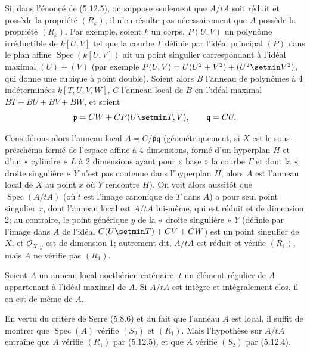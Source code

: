 \begin{remark}[5.12.6]
\label{IV.2.s5.12.6-fr}
Si, dans l'énoncé de (5.12.5), on suppose seulement que $A/tA$ soit réduit et
possède la propriété $(R_k)$, il n'en résulte pas nécessairement que $A$
possède la propriété $(R_k)$. Par exemple, soient $k$ un corps, $P(U,V)$ un
polynôme irréductible de $k[U,V]$ tel que la courbe $\Gamma$ définie par
l'idéal principal $(P)$ dans le plan affine $\operatorname{Spec}(k[U,V])$ ait
un point singulier correspondant à l'idéal maximal $(U)+(V)$ (par exemple
$P(U,V)=U(U^2+V^2)+(U^2\setmin V^2)$, qui donne une cubique à point double). Soient
alors $B$ l'anneau de polynômes à 4 indéterminées $k[T,U,V,W]$, $C$ l'anneau
local de $B$ en l'idéal maximal $BT+BU+BV+BW$, et soient
\[
\mathfrak p=CW+CP(U\setmin T,V),\qquad \mathfrak q=CU.
\]

Considérons alors l'anneau local $A=C/\mathfrak p\mathfrak q$
(géométriquement, si $X$ est le sous-préschéma fermé de l'espace affine à 4
dimensions, formé d'un hyperplan $H$ et d'un « cylindre » $L$ à 2 dimensions
ayant pour « base » la courbe $\Gamma$ et dont la « droite singulière » $Y$
n'est pas contenue dans l'hyperplan $H$, alors $A$ est l'anneau local de $X$ au
point $x$ où $Y$ rencontre $H$). On voit alors aussitôt que
$\operatorname{Spec}(A/tA)$ (où $t$ est l'image canonique de $T$ dans $A$) a
pour seul point singulier $x$, dont l'anneau local est $A/tA$ lui-même, qui est
réduit et de dimension 2; au contraire, le point générique $y$ de la « droite
singulière » $Y$ (définie par l'image dans $A$ de l'idéal
$C(U\setmin T)+CV+CW$) est un point singulier de $X$, et
$\mathcal O_{X,y}$ est de dimension 1; autrement dit, $A/tA$ est réduit et
vérifie $(R_1)$, mais $A$ ne vérifie pas $(R_1)$.
\end{remark}


\begin{corollary}[5.12.7]
\label{IV.2.s5.12.7-fr}
Soient $A$ un anneau local noethérien caténaire, $t$ un élément régulier de
$A$ appartenant à l'idéal maximal de $A$. Si $A/tA$ est intègre et
intégralement clos, il en est de même de $A$.
\end{corollary}

En vertu du critère de Serre (5.8.6) et du fait que l'anneau $A$ est local, il
suffit de montrer que $\operatorname{Spec}(A)$ vérifie $(S_2)$ et $(R_1)$.
Mais l'hypothèse sur $A/tA$ entraîne que $A$ vérifie $(R_1)$ par (5.12.5), et
que $A$ vérifie $(S_2)$ par (5.12.4).


